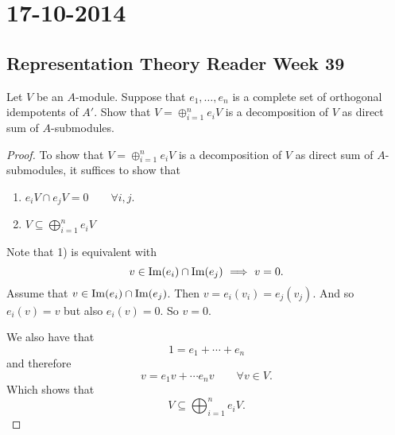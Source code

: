 \section{17-10-2014}
\subsection{Representation Theory Reader Week 39}

\begin{thm}[Exercise 1]
Let \(V\) be an \(A\)-module. Suppose that \(e_{1},\ldots ,e_{n}\) is a complete set of orthogonal idempotents of \(A'\). Show that \(V=\oplus _{i=1}^ne_{i}V\) is a decomposition of \(V\) as direct sum of \(A\)-submodules.
\end{thm}

\begin{proof}
To show that \(V=\oplus _{i=1}^ne_{i}V\) is a decomposition of \(V\) as direct sum of \(A\)-submodules, it suffices to show that

\begin{enumerate}
  \item \(e_{i}V\cap e_{j}V=0  \qquad \forall i,j.\)
  \item \(V\subseteq \bigoplus_{i=1}^ne_{i}V\)
\end{enumerate}

Note that 1) is equivalent with
\[
v\in \operatorname{Im}(e_{i})\cap \operatorname{Im}(e_{j})\  \Longrightarrow \  v=0.
\]
Assume that \(v\in \operatorname{Im}(e_{i})\cap \operatorname{Im}(e_{j})\). Then \(v=e_{i}(v_{i})=e_{j}(v_{j})\). And so \(e_{i}(v)=v\) but also \(e_{i}(v)=0.\) So \(v=0\).

We also have that
\[
1=e_{1}+\cdots +e_{n}
\]
and therefore
\[
v=e_{1}v+\cdots e_{n}v \qquad \forall v\in V.
\]
Which shows that
\[
V\subseteq \bigoplus_{i=1}^ne_{i}V.
\]
\end{proof}
\newpage

